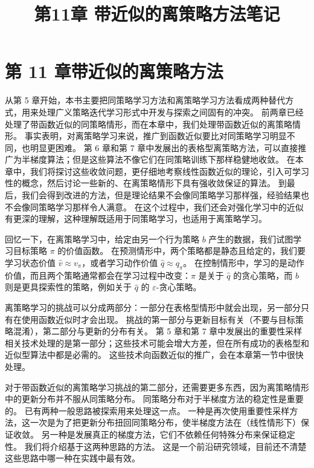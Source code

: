 \documentclass[UTF8,12pt,a4paper,fontset=fandol]{ctexart}
\title{第11章 带近似的离策略方法笔记}
\author{}
\date{}
\begin{document}
\maketitle

\section*{第 11 章\quad 带近似的离策略方法}

从第 5 章开始，本书主要把同策略学习方法和离策略学习方法看成两种替代方式，用来处理广义策略迭代学习形式中开发与探索之间固有的冲突。
前两章已经处理了带函数近似的同策略情形，而在本章中，我们处理带函数近似的离策略情形。
事实表明，对离策略学习来说，推广到函数近似要比对同策略学习明显不同，也明显更困难。
第 6 章和第 7 章中发展出的表格型离策略方法，可以直接推广为半梯度算法；但是这些算法不像它们在同策略训练下那样稳健地收敛。
在本章中，我们将探讨这些收敛问题，更仔细地考察线性函数近似的理论，引入可学习性的概念，然后讨论一些新的、在离策略情形下具有强收敛保证的算法。
到最后，我们会得到改进的方法，但是理论结果不会像同策略学习那样强，经验结果也不会像同策略学习那样令人满意。
在这个过程中，我们还会对强化学习中的近似有更深的理解，这种理解既适用于同策略学习，也适用于离策略学习。

回忆一下，在离策略学习中，给定由另一个行为策略 $b$ 产生的数据，我们试图学习目标策略 $\pi$ 的价值函数。
在预测情形中，两个策略都是静态且给定的，我们要学习状态价值 $\hat v\approx v_\pi$，或者学习动作价值 $\hat q\approx q_\pi$。
在控制情形中，学习的是动作价值，而且两个策略通常都会在学习过程中改变：$\pi$ 是关于 $\hat q$ 的贪心策略，而 $b$ 则是更具探索性的策略，例如关于 $\hat q$ 的 $\varepsilon$-贪心策略。

离策略学习的挑战可以分成两部分：一部分在表格型情形中就会出现，另一部分只有在使用函数近似时才会出现。
挑战的第一部分与更新目标有关（不要与目标策略混淆），第二部分与更新的分布有关。
第 5 章和第 7 章中发展出的重要性采样相关技术处理的是第一部分；这些技术可能会增大方差，但在所有成功的表格型和近似型算法中都是必需的。
这些技术向函数近似的推广，会在本章第一节中很快处理。

对于带函数近似的离策略学习挑战的第二部分，还需要更多东西，因为离策略情形中的更新分布并不服从同策略分布。
同策略分布对于半梯度方法的稳定性是重要的。
已有两种一般思路被探索用来处理这一点。
一种是再次使用重要性采样方法，这一次是为了把更新分布扭回同策略分布，使半梯度方法在（线性情形下）保证收敛。
另一种是发展真正的梯度方法，它们不依赖任何特殊分布来保证稳定性。
我们将介绍基于这两种思路的方法。
这是一个前沿研究领域，目前还不清楚这些思路中哪一种在实践中最有效。
\end{document}
